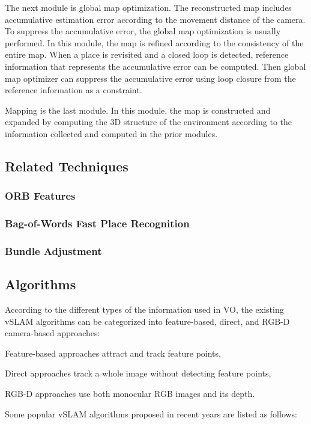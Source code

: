 The next module is global map optimization. The reconstructed map includes accumulative estimation error according to the movement distance of the camera. To suppress the accumulative error, the global map optimization is usually performed. In this module, the map is refined according to the consistency of the entire map. When a place is revisited and a closed loop is detected, reference information that represents the accumulative error can be computed. Then global map optimizer can suppress the accumulative error using loop closure from the reference information as a constraint.

Mapping is the last module. In this module, the map is constructed and expanded by computing the 3D structure of the environment according to the information collected and computed in the prior modules.

\subsection{Related Techniques}

\subsubsection{ORB Features}
\cite{rublee2011orb}
\subsubsection{Bag-of-Words Fast Place Recognition}
\cite{galvez2012bags}
\subsubsection{Bundle Adjustment}
\cite{hartley2003multiple}\cite{triggs1999bundle}


\subsection{Algorithms}
 According to the different types of the information used in VO, the existing vSLAM algorithms can be categorized into feature-based, direct, and RGB-D camera-based approaches:
\begin{inparaenum}[(i)]
	\item Feature-based approaches attract and track feature points,
	\item Direct approaches track a whole image without detecting feature points,
	\item RGB-D approaches use both monocular RGB images and its depth.
\end{inparaenum}
Some popular vSLAM algorithms proposed in recent years are listed as follows:

